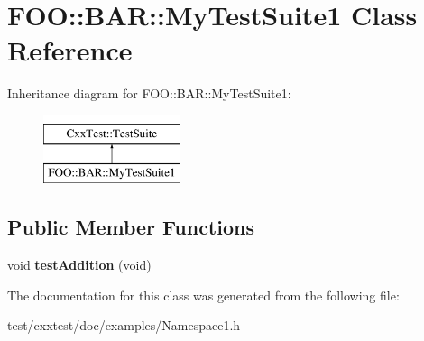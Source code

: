 \hypertarget{classFOO_1_1BAR_1_1MyTestSuite1}{\section{F\-O\-O\-:\-:B\-A\-R\-:\-:My\-Test\-Suite1 Class Reference}
\label{classFOO_1_1BAR_1_1MyTestSuite1}
}
Inheritance diagram for F\-O\-O\-:\-:B\-A\-R\-:\-:My\-Test\-Suite1\-:\begin{figure}[H]
\begin{center}
\leavevmode
\includegraphics[height=2.000000cm]{classFOO_1_1BAR_1_1MyTestSuite1}
\end{center}
\end{figure}
\subsection*{Public Member Functions}
\begin{DoxyCompactItemize}
\item 
\hypertarget{classFOO_1_1BAR_1_1MyTestSuite1_a8fab3af7d71be7b109e3cffbd050973b}{void {\bfseries test\-Addition} (void)}\label{classFOO_1_1BAR_1_1MyTestSuite1_a8fab3af7d71be7b109e3cffbd050973b}

\end{DoxyCompactItemize}


The documentation for this class was generated from the following file\-:\begin{DoxyCompactItemize}
\item 
test/cxxtest/doc/examples/Namespace1.\-h\end{DoxyCompactItemize}
